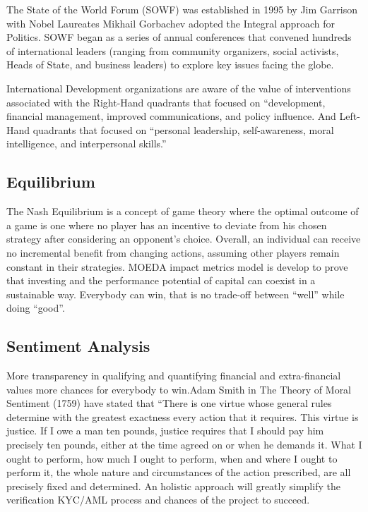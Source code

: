 \documentclass{article}
\begin{document}
The State of the World Forum (SOWF) was established in 1995 by Jim Garrison with Nobel Laureates Mikhail Gorbachev adopted the Integral approach for Politics. SOWF began as a series of annual conferences that convened hundreds of international leaders (ranging from community organizers, social activists, Heads of State, and business leaders) to explore key issues facing the globe. 

International Development organizations are aware of the value of interventions associated with the Right-Hand quadrants that focused on “development, financial management, improved communications, and policy influence. And Left-Hand quadrants that focused on “personal leadership, self-awareness, moral intelligence, and interpersonal skills.” 

\subsection {Equilibrium}

The Nash Equilibrium is a concept of game theory where the optimal outcome of a game is one where no player has an incentive to deviate from his chosen strategy after considering an opponent's choice. Overall, an individual can receive no incremental benefit from changing actions, assuming other players remain constant in their strategies. MOEDA impact metrics model is develop to prove that investing and the performance potential of capital can coexist in a sustainable way. Everybody can win, that is no trade-off between “well” while doing “good”.  

\subsection {Sentiment Analysis}

More transparency in qualifying and quantifying financial and extra-financial values more chances for everybody to win.Adam Smith in The Theory of Moral Sentiment (1759) have stated that “There is one virtue whose general rules determine with the greatest exactness every action that it requires. This virtue is justice. If I owe a man ten pounds, justice requires that I should pay him precisely ten pounds, either at the time agreed on or when he demands it. What I ought to perform, how much I ought to perform, when and where I ought to perform it, the whole nature and circumstances of the action prescribed, are all precisely fixed and determined. An holistic approach will greatly simplify the verification KYC/AML process and chances of the project to succeed. 
\end{document}
